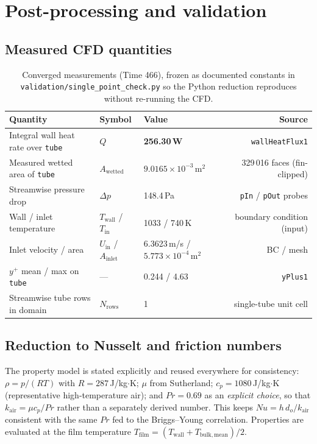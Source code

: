 \documentclass[11pt]{article}
\newcommand{\file}[1]{\texttt{\small #1}}
\begin{document}
\section{Post-processing and validation}

\subsection{Measured CFD quantities}

\begin{table}[h]\centering\small
\caption{Converged measurements (Time 466), frozen as documented constants in
\file{validation/single\_point\_check.py} so the Python reduction reproduces without re-running the CFD.}
\label{tab:measured}
\begin{tabular}{@{}lllr@{}}
\toprule
Quantity & Symbol & Value & Source\\
\midrule
Integral wall heat rate over \file{tube} & $Q$ & \textbf{256.30\,W} & \file{wallHeatFlux1}\\
Measured wetted area of \file{tube} & $A_\mathrm{wetted}$ & $9.0165\times10^{-3}$\,m$^2$ & 329\,016 faces (fin-clipped)\\
Streamwise pressure drop & $\Delta p$ & 148.4\,Pa & \file{pIn} / \file{pOut} probes\\
Wall / inlet temperature & $T_\mathrm{wall}$ / $T_\mathrm{in}$ & 1033 / 740\,K & boundary condition (input)\\
Inlet velocity / area & $U_\mathrm{in}$ / $A_\mathrm{inlet}$ & 6.3623\,m/s / $5.773\times10^{-4}$\,m$^2$ & BC / mesh\\
$y^+$ mean / max on \file{tube} & --- & 0.244 / 4.63 & \file{yPlus1}\\
Streamwise tube rows in domain & $N_\mathrm{rows}$ & 1 & single-tube unit cell\\
\bottomrule
\end{tabular}
\end{table}

\subsection{Reduction to Nusselt and friction numbers}

The property model is stated explicitly and reused everywhere for consistency: $\rho = p/(RT)$ with
$R=287$\,J/kg$\cdot$K; $\mu$ from Sutherland; $c_p = 1080$\,J/kg$\cdot$K (representative high-temperature air);
and $Pr = 0.69$ as an \emph{explicit choice}, so that $k_\mathrm{air} = \mu c_p / Pr$ rather than a separately
derived number. This keeps $Nu = h\,d_o/k_\mathrm{air}$ consistent with the same $Pr$ fed to the Briggs--Young
correlation. Properties are evaluated at the film temperature
$T_\mathrm{film} = (T_\mathrm{wall}+T_\mathrm{bulk,mean})/2$.
\end{document}

